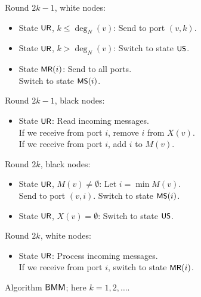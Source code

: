 \begin{table}
    \raggedright
    \algtoprule
    \begin{descriptionb}
        \item[Round $2k-1$, white nodes:] \mbox{}
        \begin{itemize}
            \item State $\textsf{\small UR}$, $k \le \deg_N(v)$: Send  to port $(v,k)$.
            \item State $\textsf{\small UR}$, $k > \deg_N(v)$: Switch to state $\textsf{\small US}$.
            \item State $\textsf{\small MR}(i)$: Send  to all ports. \\
                Switch to state $\textsf{\small MS}(i)$.
        \end{itemize}
        \item[Round $2k-1$, black nodes:] \mbox{}
        \begin{itemize}
            \item State $\textsf{\small UR}$: Read incoming messages. \\
                If we receive  from port $i$, remove $i$ from $X(v)$. \\
                If we receive  from port $i$, add $i$ to $M(v)$.
        \end{itemize}
        \item[Round $2k$, black nodes:] \mbox{}
        \begin{itemize}
            \item State $\textsf{\small UR}$, $M(v) \ne \emptyset$: Let $i = \min M(v)$. \\
                Send  to port $(v,i)$. Switch to state $\textsf{\small MS}(i)$.
            \item State $\textsf{\small UR}$, $X(v) = \emptyset$: Switch to state $\textsf{\small US}$.
        \end{itemize}
        \item[Round $2k$, white nodes:] \mbox{}
        \begin{itemize}
            \item State $\textsf{\small UR}$: Process incoming messages. \\
                If we receive  from port $i$, switch to state $\textsf{\small MR}(i)$.
        \end{itemize}
    \end{descriptionb}
    \algbottomrule
    \caption{Algorithm $\textsf{BMM}$; here $k = 1, 2, \dotsc$.}\label{tab:bmm}
\end{table}

